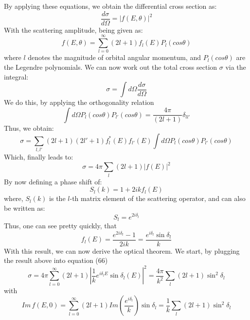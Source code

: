 \documentclass[a4paper]{article}
\begin{document}
By applying these equations, we obtain the differential cross section as:
\begin{equation}
    \frac{d\sigma}{d\Omega}=|f(E,\theta)|^2
\end{equation}
With the scattering amplitude, being given as:
\begin{equation}
    f(E,\theta)=\sum_{l=0}^\infty(2l+1)f_l(E)P_l(cos\theta)
\end{equation}
where $l$ denotes the magnitude of orbital angular momentum, and
$P_l(cos\theta)$ are the Legendre polynomials.
We can now work out the total cross section $\sigma$ via the integral:
\begin{equation}
    \sigma=\int{d\Omega\frac{d\sigma}{d\Omega}}
\end{equation}
We do this, by applying the orthogonality relation
\begin{equation}
    \int{d\Omega P_l(cos\theta)P_{l'}(cos\theta)}=\frac{4\pi}{(2l+1)}\delta_{ll'}
\end{equation}
Thus, we obtain:
\begin{equation}
    \sigma=\sum_{l,l'}(2l+1)(2l'+1)f^*_l(E)f_{l'}(E)\int{d\Omega
    P_l(cos\theta)P_{l'}(cos\theta)}
\end{equation}
Which, finally leads to:
\begin{equation}
    \sigma=4\pi\sum_l(2l+1)|f(E)|^2
\end{equation}
By now defining a phase shift of:
\begin{equation}
    S_l(k)=1+2ikf_l(E)
\end{equation}
where, $S_l(k)$ is the $l$-th matrix element of the scattering operator, and
can also be written as:
\begin{equation}
    S_l=e^{2i\delta_l}
\end{equation}
Thus, one can see pretty quickly, that
\begin{equation}
    f_l(E)=\frac{e^{2i\delta_t}-1}{2ik}=\frac{e^{i\delta_l}\sin{\delta_l}}{k}
\end{equation}
With this result, we can now derive the optical theorem. We start, by plugging
the result above into equation (66)
\begin{equation}
    \sigma=4\pi\sum_{l=0}^\infty
    (2l+1)|\frac{1}{k}e^{i\delta_lE}\sin{\delta_l(E)}|^2
    =\frac{4\pi}{k^2}\sum_l (2l+1)\sin^2{\delta_l}
\end{equation}
with
\begin{equation}
    Im\, f(E,0)=\sum_{l=0}^\infty
    (2l+1)Im(\frac{e^{i\delta_l}}{k})\sin{\delta_l}=\frac{1}{k}\sum_l
    (2l+1)\sin^2{\delta_l}
\end{equation}
\end{document}
